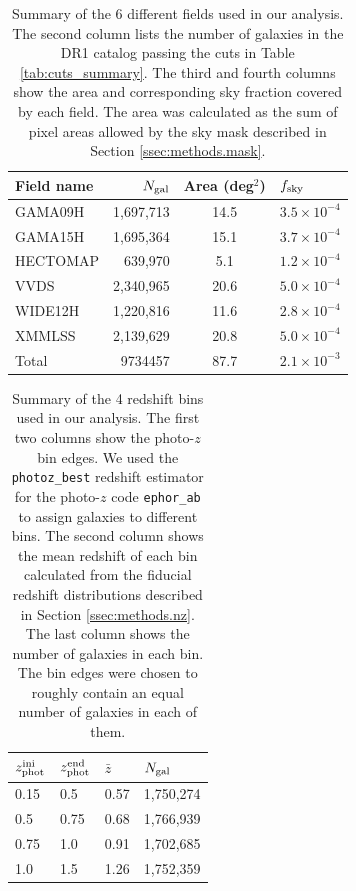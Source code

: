 \documentclass[a4paper,11pt]{article}
\begin{document}
  \begin{table}
  \centering
  \begin{tabular}{|l|r|c|l|}
   \hline
   {\bf Field name} & $N_{\rm gal}$ & {\bf Area} (deg$^2$) & $f_{\rm sky}$ \\
   \hline
   GAMA09H  & 1,697,713 & 14.5 & $3.5\times10^{-4}$ \\
   GAMA15H  & 1,695,364 & 15.1 & $3.7\times10^{-4}$ \\
   HECTOMAP &   639,970 &  5.1 & $1.2\times10^{-4}$ \\
   VVDS     & 2,340,965 & 20.6 & $5.0\times10^{-4}$ \\
   WIDE12H  & 1,220,816 & 11.6 & $2.8\times10^{-4}$ \\
   XMMLSS   & 2,139,629 & 20.8 & $5.0\times10^{-4}$ \\
   \hline
   Total    & 9734457 & 87.7 & $2.1\times10^{-3}$ \\
   \hline
  \end{tabular}
  \caption{Summary of the 6 different fields used in our analysis. The second column lists the number of galaxies in the DR1 catalog passing the cuts in Table \ref{tab:cuts_summary}. The third and fourth columns show the area and corresponding sky fraction covered by each field. The area was calculated as the sum of pixel areas allowed by the sky mask described in Section \ref{ssec:methods.mask}.} \label{tab:field_summary}
  \end{table}  

  \begin{table}
  \centering
  \begin{tabular}{|l|l|l|l|}
    \hline
    $z_{\rm phot}^{\rm ini}$ & $z_{\rm phot}^{\rm end}$ & $\bar{z}$ & $N_{\rm gal}$ \\
    \hline
    0.15 & 0.5  & 0.57 & 1,750,274 \\
    0.5  & 0.75 & 0.68 & 1,766,939 \\
    0.75 & 1.0  & 0.91 & 1,702,685 \\
    1.0  & 1.5  & 1.26 & 1,752,359 \\
    \hline
  \end{tabular}
  \caption{Summary of the 4 redshift bins used in our analysis. The first two columns show the photo-$z$ bin edges. We used the {\tt photoz\_best} redshift estimator for the photo-$z$ code {\tt ephor\_ab} to assign galaxies to different bins. The second column shows the mean redshift of each bin calculated from the fiducial redshift distributions described in Section \ref{ssec:methods.nz}. The last column shows the number of galaxies in each bin. The bin edges were chosen to roughly contain an equal number of galaxies in each of them.} \label{tab:bins_summary}
  \end{table}
  
\end{document}
